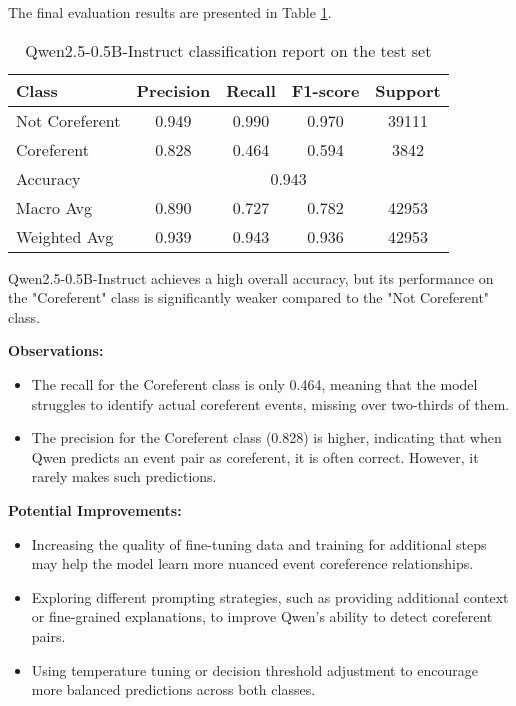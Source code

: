 \documentclass[12pt,a4paper]{article}
\begin{document}
The final evaluation results are presented in Table \ref{tab:qwen_results}.

\begin{table}[h]
    \centering
    \begin{tabular}{|l|c|c|c|c|}
        \hline
        Class & Precision & Recall & F1-score & Support \\
        \hline
        Not Coreferent & 0.949 & 0.990 & 0.970 & 39111 \\
        Coreferent & 0.828 & 0.464 & 0.594 & 3842 \\
        \hline
        Accuracy & \multicolumn{4}{c|}{0.943} \\
        Macro Avg & 0.890 & 0.727 & 0.782 & 42953 \\
        Weighted Avg & 0.939 & 0.943 & 0.936 & 42953 \\
        \hline
    \end{tabular}
    \caption{Qwen2.5-0.5B-Instruct classification report on the test set}
    \label{tab:qwen_results}
\end{table}


Qwen2.5-0.5B-Instruct achieves a high overall accuracy, but its performance on the "Coreferent" class is significantly weaker compared to the "Not Coreferent" class.

\textbf{Observations:}
\begin{itemize}
    \item The recall for the Coreferent class is only 0.464, meaning that the model struggles to identify actual coreferent events, missing over two-thirds of them.
    \item The precision for the Coreferent class (0.828) is higher, indicating that when Qwen predicts an event pair as coreferent, it is often correct. However, it rarely makes such predictions.
\end{itemize}

\textbf{Potential Improvements:}
\begin{itemize}
    \item Increasing the quality of fine-tuning data and training for additional steps may help the model learn more nuanced event coreference relationships.
    \item Exploring different prompting strategies, such as providing additional context or fine-grained explanations, to improve Qwen’s ability to detect coreferent pairs.
    \item Using temperature tuning or decision threshold adjustment to encourage more balanced predictions across both classes.
\end{itemize}
\end{document}
